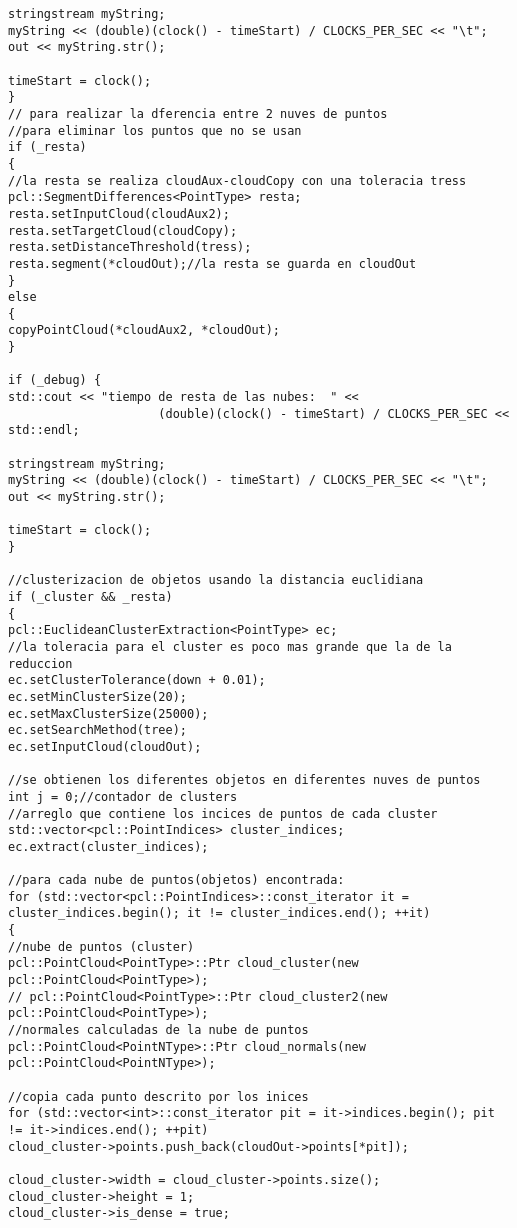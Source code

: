 {\begin{lstlisting}[caption={Archivo test.cpp}]
stringstream myString;
myString << (double)(clock() - timeStart) / CLOCKS_PER_SEC << "\t";
out << myString.str();

timeStart = clock();
}
// para realizar la dferencia entre 2 nuves de puntos
//para eliminar los puntos que no se usan 
if (_resta)
{
//la resta se realiza cloudAux-cloudCopy con una toleracia tress
pcl::SegmentDifferences<PointType> resta;
resta.setInputCloud(cloudAux2);
resta.setTargetCloud(cloudCopy);
resta.setDistanceThreshold(tress);
resta.segment(*cloudOut);//la resta se guarda en cloudOut
}
else
{
copyPointCloud(*cloudAux2, *cloudOut);
}

if (_debug) {
std::cout << "tiempo de resta de las nubes:  " <<
					 (double)(clock() - timeStart) / CLOCKS_PER_SEC << std::endl;

stringstream myString;
myString << (double)(clock() - timeStart) / CLOCKS_PER_SEC << "\t";
out << myString.str();

timeStart = clock();
}

//clusterizacion de objetos usando la distancia euclidiana
if (_cluster && _resta)
{
pcl::EuclideanClusterExtraction<PointType> ec;
//la toleracia para el cluster es poco mas grande que la de la reduccion
ec.setClusterTolerance(down + 0.01);  
ec.setMinClusterSize(20);
ec.setMaxClusterSize(25000);
ec.setSearchMethod(tree);
ec.setInputCloud(cloudOut);

//se obtienen los diferentes objetos en diferentes nuves de puntos
int j = 0;//contador de clusters
//arreglo que contiene los incices de puntos de cada cluster
std::vector<pcl::PointIndices> cluster_indices;
ec.extract(cluster_indices);

//para cada nube de puntos(objetos) encontrada:
for (std::vector<pcl::PointIndices>::const_iterator it = cluster_indices.begin(); it != cluster_indices.end(); ++it)
{
//nube de puntos (cluster)
pcl::PointCloud<PointType>::Ptr cloud_cluster(new pcl::PointCloud<PointType>);
// pcl::PointCloud<PointType>::Ptr cloud_cluster2(new pcl::PointCloud<PointType>);
//normales calculadas de la nube de puntos
pcl::PointCloud<PointNType>::Ptr cloud_normals(new pcl::PointCloud<PointNType>);

//copia cada punto descrito por los inices
for (std::vector<int>::const_iterator pit = it->indices.begin(); pit != it->indices.end(); ++pit)
cloud_cluster->points.push_back(cloudOut->points[*pit]);

cloud_cluster->width = cloud_cluster->points.size();
cloud_cluster->height = 1;
cloud_cluster->is_dense = true;


\end{lstlisting}}
